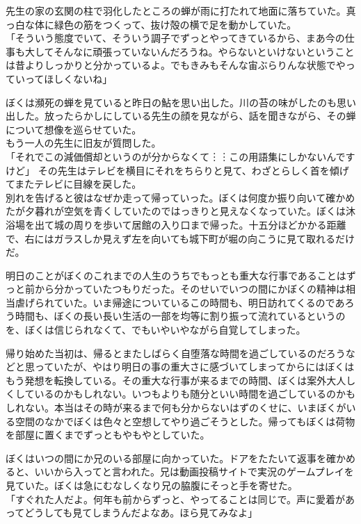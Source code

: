 \documentclass[b5j,twoside,twocolumn]{utarticle}
\begin{document}
先生の家の玄関の柱で羽化したところの蝉が雨に打たれて地面に落ちていた。真っ白な体に緑色の筋をつくって、抜け殻の横で足を動かしていた。\\
「そういう態度でいて、そういう調子でずっとやってきているから、まあ今の仕事も大してそんなに頑張っていないんだろうね。やらないといけないということは昔よりしっかりと分かっているよ。でもきみもそんな宙ぶらりんな状態でやっていってほしくないね」


ぼくは瀕死の蝉を見ていると昨日の鮎を思い出した。川の苔の味がしたのも思い出した。放ったらかしにしている先生の顔を見ながら、話を聞きながら、その蝉について想像を巡らせていた。\\
もう一人の先生に旧友が質問した。\\
「それでこの減価償却というのが分からなくて︙︙この用語集にしかないんですけど」
その先生はテレビを横目にそれをちらりと見て、わざとらしく首を傾げてまたテレビに目線を戻した。\\



別れを告げると彼はなぜか走って帰っていった。ぼくは何度か振り向いて確かめたが夕暮れが空気を青くしていたのではっきりと見えなくなっていた。ぼくは沐浴場を出て城の周りを歩いて居館の入り口まで帰った。十五分ほどかかる距離で、右にはガラスしか見えず左を向いても城下町が堀の向こうに見て取れるだけだ。


明日のことがぼくのこれまでの人生のうちでもっとも重大な行事であることはずっと前から分かっていたつもりだった。そのせいでいつの間にかぼくの精神は相当虐げられていた。いま帰途についているこの時間も、明日訪れてくるのであろう時間も、ぼくの長い長い生活の一部を均等に割り振って流れているというのを、ぼくは信じられなくて、でもいやいやながら自覚してしまった。


帰り始めた当初は、帰るとまたしばらく自堕落な時間を過ごしているのだろうなどと思っていたが、やはり明日の事の重大さに感づいてしまってからにはぼくはもう発想を転換している。その重大な行事が来るまでの時間、ぼくは案外大人しくしているのかもしれない。いつもよりも随分といい時間を過ごしているのかもしれない。本当はその時が来るまで何も分からないはずのくせに、いまぼくがいる空間のなかでぼくは色々と空想してやり過ごそうとした。帰ってもぼくは荷物を部屋に置くまでずっともやもやとしていた。


ぼくはいつの間にか兄のいる部屋に向かっていた。ドアをたたいて返事を確かめると、いいから入ってと言われた。兄は動画投稿サイトで実況のゲームプレイを見ていた。ぼくは急にむなしくなり兄の脇腹にそっと手を寄せた。\\
「すぐれた人だよ。何年も前からずっと、やってることは同じで。声に愛着があってどうしても見てしまうんだよなあ。ほら見てみなよ」
\end{document}
